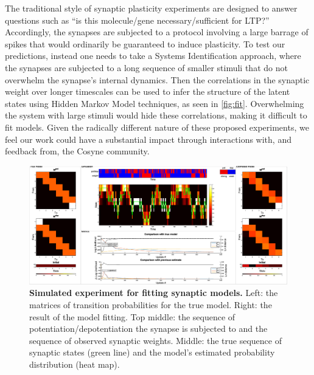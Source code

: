 \documentclass[12pt]{article}
\begin{document}
The traditional style of synaptic plasticity experiments are designed to answer questions such as ``is this molecule/gene necessary/sufficient for LTP?'' Accordingly, the synapses are subjected to a protocol involving a large barrage of spikes that would ordinarily be guaranteed to induce plasticity. To test our predictions, instead one needs to take a Systems Identification approach, where the synapses are subjected to a long sequence of smaller stimuli that do not overwhelm the synapse’s internal dynamics. Then the correlations in the synaptic weight over longer timescales can be used to infer the structure of the latent states using Hidden Markov Model techniques, as seen in \autoref{fig:fit}. Overwhelming the system with large stimuli would hide these correlations, making it difficult to fit models. Given the radically different nature of these proposed experiments, we feel our work could have a substantial impact through interactions with, and feedback from, the Cosyne community.

\begin{figure}[h]
  \centering
  \includegraphics[width=0.99\linewidth]{FitVid939.eps}
  \caption{\textbf{Simulated experiment for fitting synaptic models.} Left: the matrices of transition probabilities for the true model. Right: the result of the model fitting. Top middle: the sequence of potentiation/depotentiation the synapse is subjected to and the sequence of observed synaptic weights. Middle: the true sequence of synaptic states (green line) and the model’s estimated probability distribution (heat map).}\label{fig:fit}
\end{figure}

\end{document}
